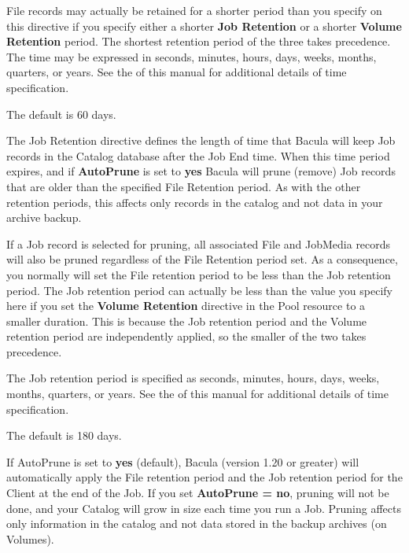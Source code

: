 \begin{description}
   File records  may actually be retained for a shorter period than you specify
   on  this directive if you specify either a shorter {\bf Job Retention}  or a
   shorter {\bf Volume Retention} period. The shortest  retention period of the
   three takes precedence.  The time may be expressed in seconds, minutes, 
   hours, days, weeks, months, quarters, or years. See the 
    of this  manual for
   additional details of time specification. 

   The  default is 60 days. 

\label{JobRetention}
\item [Job Retention = \lt{}time-period-specification\gt{}]
   \label{JobRetention}
   The Job Retention directive defines the length of time that  Bacula will keep
   Job records in the Catalog database after the Job End time.  When
   this time period expires, and if {\bf AutoPrune} is set to {\bf yes}
   Bacula will prune (remove) Job records that are older than the specified
   File Retention period.  As with the other retention periods, this
   affects only records in the catalog and not data in your archive backup.

   If a Job record is selected for pruning, all associated File and JobMedia
   records will also be pruned regardless of the File Retention period set.
   As a consequence, you normally will set the File retention period to be
   less than the Job retention period.  The Job retention period can actually
   be less than the value you specify here if you set the {\bf Volume
   Retention} directive in the Pool resource to a smaller duration.  This is
   because the Job retention period and the Volume retention period are
   independently applied, so the smaller of the two takes precedence.

   The Job retention period is specified as seconds,  minutes, hours, days,
   weeks, months,  quarters, or years.  See the 
    of this manual for
   additional details of  time specification.  

   The default is 180 days.  

\label{AutoPrune}
\item [AutoPrune = \lt{}yes\vb{}no\gt{}]
   If AutoPrune is set to  {\bf yes} (default), Bacula (version 1.20 or greater)
   will  automatically apply the File retention period and the Job  retention
   period for the Client at the end of the Job.  If you set {\bf AutoPrune = no},
   pruning will not be done,  and your Catalog will grow in size each time you
   run a Job.  Pruning affects only information in the catalog and not data 
   stored in the backup archives (on Volumes).  


\end{description}
